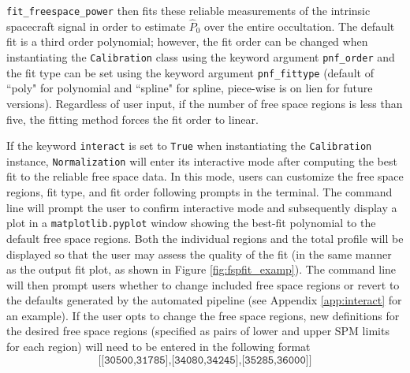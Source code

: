 \documentclass[titlepage, 12pt]{article}
\begin{document}
                \texttt{fit\_freespace\_power} then fits these reliable measurements
                of the intrinsic spacecraft signal in order to estimate
                $\hat{P}_0$ over the entire occultation. The default fit is a
                third order polynomial; however, the fit order can be changed
                when instantiating the \texttt{Calibration} class using the
                keyword argument \texttt{pnf\_order} and the fit type can be
                set using the keyword argument \texttt{pnf\_fittype}
                (default of ``poly" for polynomial and ``spline" for spline,
                piece-wise is on lien for future versions). Regardless of user
                input, if the number of free space regions is less than five,
                the fitting method forces the fit order to linear.
                \par\hfill\par
                If the keyword \texttt{interact} is set to \texttt{True} 
                when instantiating the \texttt{Calibration} instance,
                \texttt{Normalization} will enter its interactive mode after
                computing the best fit to the reliable free space data. In this
                mode, users can customize the free space regions, fit type, and
                fit order following prompts in the terminal.
                The command line will prompt the user to confirm interactive
                mode and subsequently display a plot in a
                \texttt{matplotlib.pyplot} window showing the best-fit
                polynomial to the default free space regions. Both the individual
                regions and the total profile will be displayed so that the
                user may assess the quality of the fit (in the same manner as
                the output fit plot, as shown in Figure \ref{fig:fspfit_examp}).
                The command line will then prompt users whether to change
                included free space regions or revert to the defaults generated
                by the automated pipeline (see Appendix \ref{app:interact}
                for an example). If the user opts to change the free space
                regions, new definitions for the desired free space regions
                (specified as pairs of lower and upper SPM limits for each region)
                will need to be entered in the following format
                \begin{equation*}
                    \texttt{[[30500,31785],[34080,34245],[35285,36000]]}
                \end{equation*}
\end{document}
